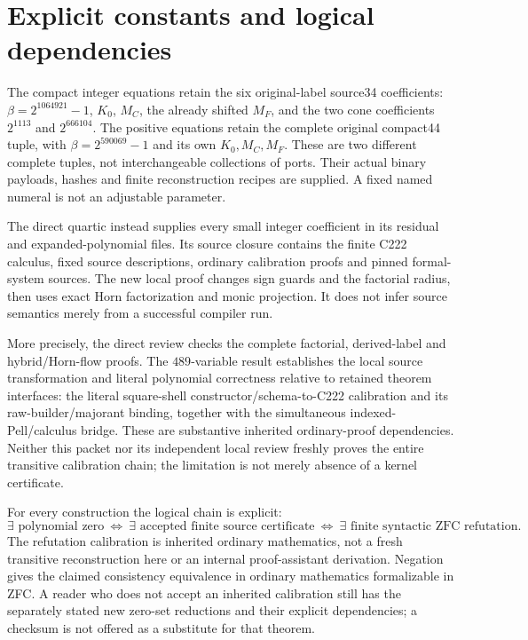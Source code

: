 \section{Explicit constants and logical dependencies}
The compact integer equations retain the six original-label source34
coefficients: $\beta=2^{1064921}-1$, $K_0$, $M_C$, the already shifted
$M_F$, and the two cone coefficients $2^{1113}$ and $2^{666104}$.
The positive equations retain the complete original compact44 tuple,
with $\beta=2^{590069}-1$ and its own $K_0,M_C,M_F$. These are two
different complete tuples, not interchangeable collections of ports.
Their actual binary payloads, hashes and finite reconstruction recipes
are supplied. A fixed named numeral is not an adjustable parameter.

The direct quartic instead supplies every small integer coefficient in
its residual and expanded-polynomial files. Its source closure contains
the finite C222 calculus, fixed source descriptions, ordinary calibration
proofs and pinned formal-system sources. The new local proof changes sign
guards and the factorial radius, then uses exact Horn factorization and
monic projection. It does not infer source semantics merely from a
successful compiler run.

More precisely, the direct review checks the complete factorial,
derived-label and hybrid/Horn-flow proofs. The $489$-variable result
establishes the local source transformation and literal polynomial
correctness relative to retained theorem interfaces: the literal
square-shell constructor/schema-to-C222 calibration and its
raw-builder/majorant binding, together with the simultaneous
indexed-Pell/calculus bridge. These are substantive inherited
ordinary-proof dependencies. Neither this packet nor its independent
local review freshly proves the entire transitive calibration chain;
the limitation is not merely absence of a kernel certificate.

For every construction the logical chain is explicit:
\[
 \exists\text{ polynomial zero}
 \ \Longleftrightarrow\ 
 \exists\text{ accepted finite source certificate}
 \ \Longleftrightarrow\ 
 \exists\text{ finite syntactic ZFC refutation}.
\]
The refutation calibration is inherited ordinary mathematics, not a fresh
transitive reconstruction here or an internal proof-assistant derivation. Negation gives the claimed consistency
equivalence in ordinary mathematics formalizable in ZFC. A reader who
does not accept an inherited calibration still has the separately stated
new zero-set reductions and their explicit dependencies; a checksum is
not offered as a substitute for that theorem.

